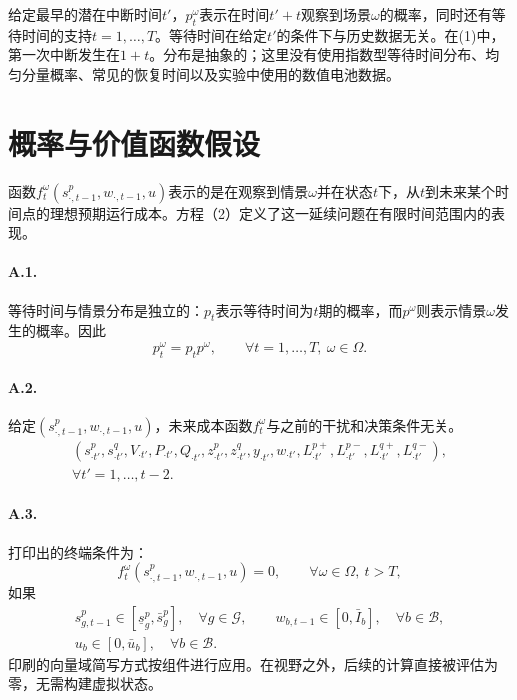 \documentclass[10pt]{article}
\begin{document}
给定最早的潜在中断时间$t'$，$p_t^\omega$表示在时间$t'+t$观察到场景$\omega$的概率，同时还有等待时间的支持$t=1,\ldots,T$。等待时间在给定$t'$的条件下与历史数据无关。在(1)中，第一次中断发生在$1+t$。分布是抽象的；这里没有使用指数型等待时间分布、均匀分量概率、常见的恢复时间以及实验中使用的数值电池数据。

\section*{概率与价值函数假设}
函数$f_t^\omega(s_{\cdot,t-1}^p,w_{\cdot,t-1},u)$表示的是在观察到情景$\omega$并在状态$t$下，从$t$到未来某个时间点的理想预期运行成本。方程（2）定义了这一延续问题在有限时间范围内的表现。

\paragraph{A.1.}
等待时间与情景分布是独立的：$p_t$表示等待时间为$t$期的概率，而$p^\omega$则表示情景$\omega$发生的概率。因此
\begin{equation}
p_t^\omega=p_t p^\omega,\qquad\forall t=1,\ldots,T,\ \omega\in\Omega.\tag{A.1}
\end{equation}
\paragraph{A.2.}
给定$(s_{\cdot,t-1}^p,w_{\cdot,t-1},u)$，未来成本函数$f_t^\omega$与之前的干扰和决策条件无关。
\[
\begin{gathered}
(s_{\cdot t'}^p,s_{\cdot t'}^q,V_{\cdot t'},P_{\cdot t'},Q_{\cdot t'},z_{\cdot t'}^p,z_{\cdot t'}^q,y_{\cdot t'},w_{\cdot t'},
L_{\cdot t'}^{p+},L_{\cdot t'}^{p-},L_{\cdot t'}^{q+},L_{\cdot t'}^{q-}),\\
\forall t'=1,\ldots,t-2.
\end{gathered}
\]
\paragraph{A.3.}
打印出的终端条件为：
\begin{equation}
f_t^\omega(s_{\cdot,t-1}^p,w_{\cdot,t-1},u)=0,\qquad\forall\omega\in\Omega,\ t>T,\tag{A.3}
\end{equation}
如果
\[
\begin{gathered}
s_{g,t-1}^p\in[\underline s_g^p,\bar s_g^p],\quad\forall g\in\mathcal G,\qquad
w_{b,t-1}\in[0,\bar I_b],\quad\forall b\in\mathcal B,\\
u_b\in[0,\bar u_b],\quad\forall b\in\mathcal B.
\end{gathered}
\]
印刷的向量域简写方式按组件进行应用。在视野之外，后续的计算直接被评估为零，无需构建虚拟状态。
\end{document}
